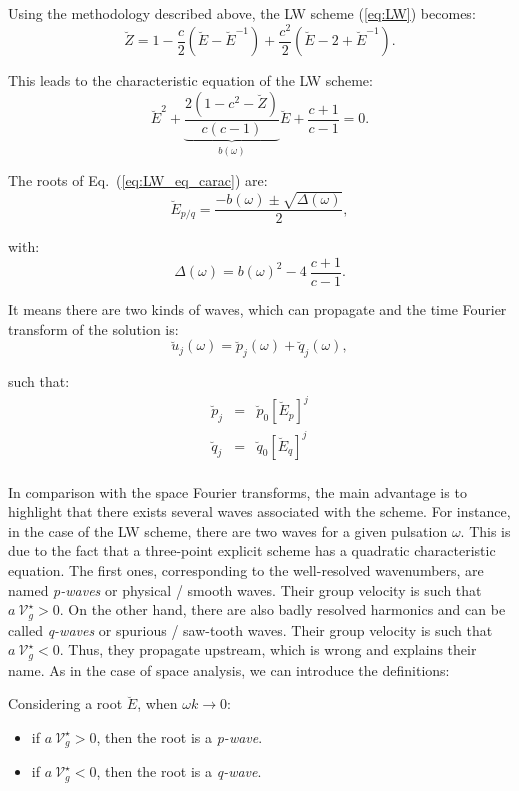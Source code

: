 \begin{example}
Using the methodology described above, the LW scheme (\ref{eq:LW}) becomes:
$$ \breve{Z} = 1 - \frac{c}{2} \left(\breve{E} - \breve{E}^{-1} \right) + \frac{c^2}{2} \left(\breve{E} -2 +\breve{E}^{-1} \right). $$

\noindent This leads to the characteristic equation of the LW scheme:
\begin{equation}
\label{eq:LW_eq_carac}
\breve{E}^2 + \underbrace{\frac{2\left(1-c^2-\breve{Z}\right)}{c(c-1)}}_{b(\omega)} \breve{E} + \frac{c+1}{c-1} = 0.
\end{equation}

\noindent The roots of Eq.~(\ref{eq:LW_eq_carac}) are:
$$ \breve{E}_{p/q} = \frac{-b(\omega) \pm \sqrt{\Delta(\omega)}}{2},$$

\noindent with:
$$ \Delta(\omega) = {b(\omega)}^2 - 4 \ \frac{c+1}{c-1}.$$

\noindent It means there are two kinds of waves, which can propagate and the time Fourier transform of the solution is:
$$ \breve{u}_j (\omega) = \breve{p}_j (\omega) + \breve{q}_j (\omega),$$

\noindent such that:
$$\begin{array}{ccc}
   \breve{p}_j &=& \breve{p}_0 \left[\breve{E}_{p}\right]^j \\
   \breve{q}_j &=& \breve{q}_0 \left[\breve{E}_{q}\right]^j \\
  \end{array}
$$
\end{example}

\vskip8mm

\noindent In comparison with the space Fourier transforms, the main advantage is to highlight that there exists several waves associated with the scheme. For instance, in the case of the LW scheme, there are two waves for a given pulsation $\omega$. This is due to the fact that a three-point explicit scheme has a quadratic characteristic equation. The first ones, corresponding to the well-resolved wavenumbers, are named {\it p-waves} or physical / smooth waves. Their group velocity is such that $a~\mathcal{V}_g^{\star} > 0$. On the other hand, there are also badly resolved harmonics and can be called {\it q-waves} or spurious / saw-tooth waves. Their group velocity is such that $a~\mathcal{V}_g^{\star} < 0$. Thus, they propagate upstream, which is wrong and explains their name. As in the case of space analysis, we can introduce the definitions:

\begin{definition}
\label{def:root}
\noindent Considering a root $\breve{E}$, when $\omega k \rightarrow 0$:
\begin{itemize}
\item if $a~\mathcal{V}_{g}^{\star} > 0$, then the root is a {\it p-wave}.
\item if $a~\mathcal{V}_{g}^{\star} < 0$, then the root is a {\it q-wave}. 
\end{itemize}
\end{definition}


